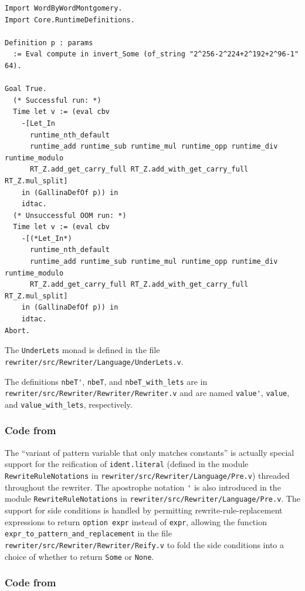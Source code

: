 \begin{subappendices}
\begin{verbatim}
Import WordByWordMontgomery.
Import Core.RuntimeDefinitions.

Definition p : params
  := Eval compute in invert_Some (of_string "2^256-2^224+2^192+2^96-1" 64).

Goal True.
  (* Successful run: *)
  Time let v := (eval cbv
    -[Let_In
      runtime_nth_default
      runtime_add runtime_sub runtime_mul runtime_opp runtime_div runtime_modulo
      RT_Z.add_get_carry_full RT_Z.add_with_get_carry_full RT_Z.mul_split]
    in (GallinaDefOf p)) in
    idtac.
  (* Unsuccessful OOM run: *)
  Time let v := (eval cbv
    -[(*Let_In*)
      runtime_nth_default
      runtime_add runtime_sub runtime_mul runtime_opp runtime_div runtime_modulo
      RT_Z.add_get_carry_full RT_Z.add_with_get_carry_full RT_Z.mul_split]
    in (GallinaDefOf p)) in
    idtac.
Abort.
\end{verbatim}

The \verb|UnderLets| monad is defined in the file \texttt{rewriter/src/Rewriter/Language/UnderLets.v}.

The definitions \verb|nbeT'|, \verb|nbeT|, and \verb|nbeT_with_lets| are in \texttt{rewriter/src/Rewriter/Rewriter/Rewriter.v} and are named \verb|value'|, \verb|value|, and \verb|value_with_lets|, respectively.

\subsubsection{Code from }

The ``variant of pattern variable that only matches constants'' is actually special support for the reification of \verb|ident.literal| (defined in the module \verb|RewriteRuleNotations| in \texttt{rewriter/src/Rewriter/Language/Pre.v}) threaded throughout the rewriter.
The apostrophe notation \verb|'| is also introduced in the module \verb|RewriteRuleNotations| in \texttt{rewriter/src/Rewriter/Language/Pre.v}.
The support for side conditions is handled by permitting rewrite-rule-replacement expressions to return \verb|option expr| instead of \verb|expr|, allowing the function \verb|expr_to_pattern_and_replacement| in the file \texttt{rewriter/src/Rewriter/Rewriter/Reify.v} to fold the side conditions into a choice of whether to return \verb|Some| or \verb|None|.

\subsubsection{Code from }


\end{subappendices}
